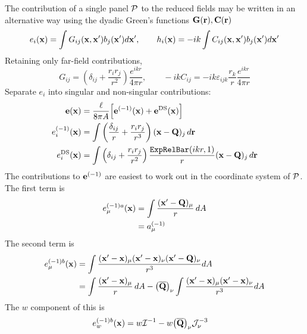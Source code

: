 \documentclass[letterpaper]{article}
\begin{document}
The contribution of a single panel $\mathcal{P}$ to the 
reduced fields may be written in an alternative way using the 
dyadic Green's functions $\mathbf{G}(\mathbf{r}), \mathbf{C}(\mathbf{r})$
$$
 e_i(\mathbf{x}) =   \int G_{ij}(\mathbf{x},\mathbf{x}^\prime) b_j(\mathbf{x}^\prime)d\mathbf{x}^\prime,
\qquad
 h_i(\mathbf{x}) = -ik\int C_{ij}(\mathbf{x},\mathbf{x}^\prime) b_j(\mathbf{x}^\prime)d\mathbf{x}^\prime
$$
Retaining only far-field contributions,
$$ 
 G_{ij}=\left( \delta_{ij} + \frac{r_i r_j}{r^2}\right) \frac{e^{ikr}}{4\pi r},
\qquad 
 -ikC_{ij}=-ik \varepsilon_{ijk} \frac{r_k}{r} \frac{e^{ikr}}{4\pi r} 
$$
Separate $e_{i}$ into singular and non-singular
contributions:
\begin{align*}
 \mathbf{e}(\mathbf{x}) &= 
 \frac{\ell}{8\pi A}\Big[ \mathbf{e}^{(-1)}(\mathbf{x}) + \mathbf{e}^{\text{\scriptsize DS}}(\mathbf{x})\Big]
\\
 e_i^{(-1)}(\mathbf{x}) 
 &=
 \int \left( \frac{\delta_{ij}}{r} 
             + \frac{r_i r_j}{r^3}
      \right) (\mathbf{x} - \mathbf{Q})_j \, d\mathbf{r}
\\
 e_i^{\text{\scriptsize DS}}(\mathbf{x})
&=
 \int \left( \delta_{ij} + \frac{r_i r_j}{r^2}
      \right) \frac{\texttt{ExpRelBar}(ikr,1)}{r}
      (\mathbf{x}-\mathbf{Q})_j \, d\mathbf{r}
\end{align*}
The contributions to $\mathbf{e}^{(-1)}$ are easiest to work out
in the coordinate system of $\mathcal{P}$. The first term is
\begin{align*}
 e_\mu^{(-1)a}(\mathbf{x})
&=\int \frac{ (\mathbf{x}^\prime-\mathbf{Q})_\mu}{r}\,dA
\\
&=a^{(-1)}_\mu
\end{align*}
The second term is
\begin{align*}
 e_\mu^{(-1)b}(\mathbf{x})
&= \int \frac { (\mathbf{x}^\prime-\mathbf{x})_\mu 
                (\mathbf{x}^\prime-\mathbf{x})_\nu
                (\mathbf{x}^\prime-\mathbf{Q})_\nu
              }{r^3} dA
\\
&= \int \frac { (\mathbf{x}^\prime-\mathbf{x})_\mu }{r}\,dA
  -\big(\overline{\mathbf{Q}}\big)_\nu
   \int \frac { (\mathbf{x}^\prime-\mathbf{x})_\mu
                (\mathbf{x}^\prime-\mathbf{x})_\nu
              } {r^3} dA
\end{align*}
The $w$ component of this is
\begin{align*}
 e_w^{(-1)b}(\mathbf{x})
&= w \mathcal{I}^{-1}
  -w \big(\overline{\mathbf{Q}}\big)_\nu \mathcal{J}_\nu^{-3}
\end{align*}
\end{document}
